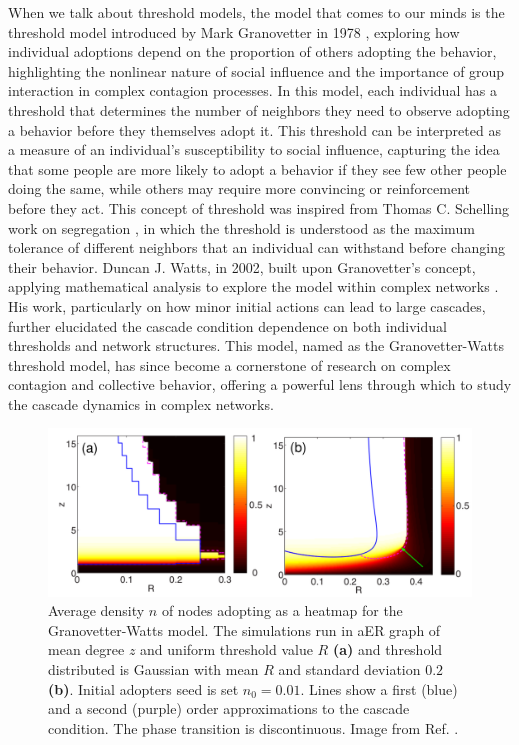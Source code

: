 When we talk about threshold models, the model that comes to our minds is the threshold model introduced by Mark Granovetter in 1978 \cite{granovetter-1978}, exploring how individual adoptions depend on the proportion of others adopting the behavior, highlighting the nonlinear nature of social influence and the importance of group interaction in complex contagion processes. In this model, each individual has a threshold that determines the number of neighbors they need to observe adopting a behavior before they themselves adopt it. This threshold can be interpreted as a measure of an individual's susceptibility to social influence, capturing the idea that some people are more likely to adopt a behavior if they see few other people doing the same, while others may require more convincing or reinforcement before they act. This concept of threshold was inspired from Thomas C. Schelling work on segregation \cite{schelling-1969}, in which the threshold is understood as the maximum tolerance of different neighbors that an individual can withstand before changing their behavior. Duncan J. Watts, in 2002, built upon Granovetter's concept, applying mathematical analysis to explore the model within complex networks \cite{watts-2002} . His work, particularly on how minor initial actions can lead to large cascades, further elucidated the cascade condition dependence on both individual thresholds and network structures. This model, named as the Granovetter-Watts threshold model, has since become a cornerstone of research on complex contagion and collective behavior, offering a powerful lens through which to study the cascade dynamics in complex networks.

\begin{figure}
    \centering
    \captionsetup{font=sf}
    \includegraphics[width=\textwidth]{Figs/Introduction/cascade_gleeson.pdf}
    \caption[Cascade diagram of the Granovetter-Watts model]{Average density $n$ of nodes adopting as a heatmap for the Granovetter-Watts model. The simulations run in aER graph of mean degree $z$ and uniform threshold value $R$  \textbf{(a)} and threshold distributed is Gaussian with mean $R$ and standard deviation $0.2$ \textbf{(b)}. Initial adopters seed is set $n_0 = 0.01$. Lines show a first (blue) and a second (purple) order approximations to the cascade condition. The phase transition is discontinuous. Image from Ref. \cite{gleeson-2007}.}
    \label{fig:Cascade_gleeson}
\end{figure}

